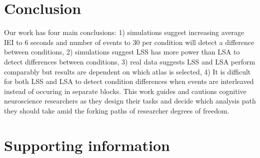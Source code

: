 \documentclass[10pt,letterpaper]{article}
\begin{document}
\section*{Conclusion}

Our work has four main conclusions:
1) simulations suggest increasing average IEI to 6 seconds and number of events to 30 per condition will detect a difference between conditions, 
2) simulations suggest LSS has more power than LSA to detect differences between conditions,
3) real data suggests LSS and LSA perform comparably but results are dependent on which atlas is selected,
4) It is difficult for both LSS and LSA to detect condition differences when events are interleaved instead of occuring in separate blocks.
This work guides and cautions cognitive neuroscience researchers as they design their tasks and decide
which analysis path they should take amid the forking paths of researcher degrees of freedom.




\section*{Supporting information}

\end{document}

